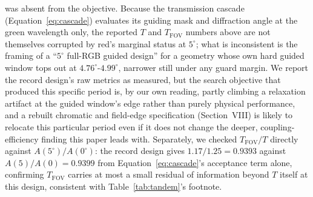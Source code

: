 \documentclass[10pt,twocolumn]{article}
\begin{document}
was absent from the objective. Because the transmission cascade (Equation~\eqref{eq:cascade})
evaluates its guiding mask and diffraction angle at the green wavelength
only, the reported $T$ and $T_{\mathrm{FOV}}$ numbers above are not
themselves corrupted by red's marginal status at $5^\circ$; what is
inconsistent is the framing of a ``$5^\circ$ full-RGB guided design'' for a
geometry whose own hard guided window tops out at $4.76^\circ$-$4.99^\circ$,
narrower still under any guard margin. We report the record design's raw
metrics as measured, but the search objective that produced this specific
period is, by our own reading, partly climbing a relaxation artifact at the
guided window's edge rather than purely physical performance, and a
rebuilt chromatic and field-edge specification (Section~VIII) is likely to
relocate this particular period even if it does not change the deeper,
coupling-efficiency finding this paper leads with. Separately, we checked
$T_{\mathrm{FOV}}/T$ directly against $A(5^\circ)/A(0^\circ)$: the record
design gives $1.17/1.25=0.9393$ against $A(5)/A(0)=0.9399$ from
Equation~\eqref{eq:cascade}'s acceptance term alone, confirming
$T_{\mathrm{FOV}}$ carries at most a small residual of information beyond
$T$ itself at this design, consistent with Table~\ref{tab:tandem}'s
footnote.
\end{document}
